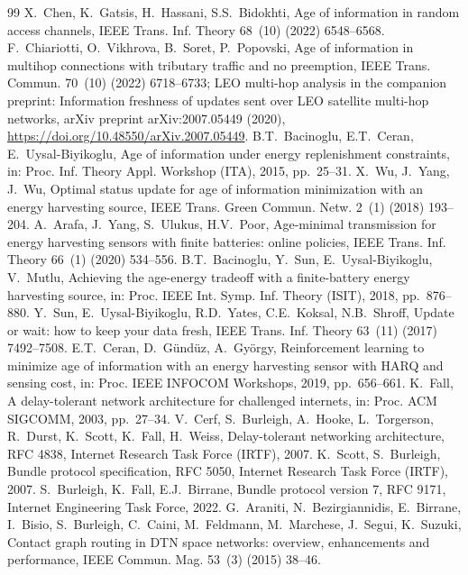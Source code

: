 \documentclass[twocolumn,3p,times,procedia]{elsarticle}
\theoremstyle{plain}
\theoremstyle{remark}
\begin{document}
\begin{thebibliography}{99}
X.~Chen, K.~Gatsis, H.~Hassani, S.S.~Bidokhti, Age of information in random access channels, IEEE Trans. Inf. Theory 68~(10) (2022) 6548--6568.
F.~Chiariotti, O.~Vikhrova, B.~Soret, P.~Popovski, Age of information in multihop connections with tributary traffic and no preemption, IEEE Trans. Commun. 70~(10) (2022) 6718--6733; LEO multi-hop analysis in the companion preprint: Information freshness of updates sent over LEO satellite multi-hop networks, arXiv preprint arXiv:2007.05449 (2020), \url{https://doi.org/10.48550/arXiv.2007.05449}.
B.T.~Bacinoglu, E.T.~Ceran, E.~Uysal-Biyikoglu, Age of information under energy replenishment constraints, in: Proc. Inf. Theory Appl. Workshop (ITA), 2015, pp.~25--31.
X.~Wu, J.~Yang, J.~Wu, Optimal status update for age of information minimization with an energy harvesting source, IEEE Trans. Green Commun. Netw. 2~(1) (2018) 193--204.
A.~Arafa, J.~Yang, S.~Ulukus, H.V.~Poor, Age-minimal transmission for energy harvesting sensors with finite batteries: online policies, IEEE Trans. Inf. Theory 66~(1) (2020) 534--556.
B.T.~Bacinoglu, Y.~Sun, E.~Uysal-Biyikoglu, V.~Mutlu, Achieving the age-energy tradeoff with a finite-battery energy harvesting source, in: Proc. IEEE Int. Symp. Inf. Theory (ISIT), 2018, pp.~876--880.
Y.~Sun, E.~Uysal-Biyikoglu, R.D.~Yates, C.E.~Koksal, N.B.~Shroff, Update or wait: how to keep your data fresh, IEEE Trans. Inf. Theory 63~(11) (2017) 7492--7508.
E.T.~Ceran, D.~G\"und\"uz, A.~Gy\"orgy, Reinforcement learning to minimize age of information with an energy harvesting sensor with HARQ and sensing cost, in: Proc. IEEE INFOCOM Workshops, 2019, pp.~656--661.
K.~Fall, A delay-tolerant network architecture for challenged internets, in: Proc. ACM SIGCOMM, 2003, pp.~27--34.
V.~Cerf, S.~Burleigh, A.~Hooke, L.~Torgerson, R.~Durst, K.~Scott, K.~Fall, H.~Weiss, Delay-tolerant networking architecture, RFC 4838, Internet Research Task Force (IRTF), 2007.
K.~Scott, S.~Burleigh, Bundle protocol specification, RFC 5050, Internet Research Task Force (IRTF), 2007.
S.~Burleigh, K.~Fall, E.J.~Birrane, Bundle protocol version 7, RFC 9171, Internet Engineering Task Force, 2022.
G.~Araniti, N.~Bezirgiannidis, E.~Birrane, I.~Bisio, S.~Burleigh, C.~Caini, M.~Feldmann, M.~Marchese, J.~Segui, K.~Suzuki, Contact graph routing in DTN space networks: overview, enhancements and performance, IEEE Commun. Mag. 53~(3) (2015) 38--46.

\end{thebibliography}
\end{document}

